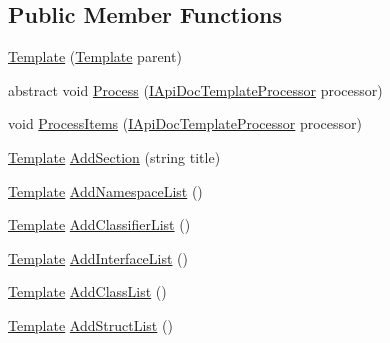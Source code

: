 \subsection*{Public Member Functions}
\begin{DoxyCompactItemize}
\item 
\hyperlink{class_software_engineering_tools_1_1_documentation_1_1_template_a584d4577dcd36a27254a3e340cfda808}{Template} (\hyperlink{class_software_engineering_tools_1_1_documentation_1_1_template}{Template} parent)
\item 
abstract void \hyperlink{class_software_engineering_tools_1_1_documentation_1_1_template_ab13b45a10b7eb65a0b6c15dbc1318664}{Process} (\hyperlink{interface_software_engineering_tools_1_1_documentation_1_1_i_api_doc_template_processor}{I\+Api\+Doc\+Template\+Processor} processor)
\item 
void \hyperlink{class_software_engineering_tools_1_1_documentation_1_1_template_a1af5e797aa609a3c851e01f020cb01e6}{Process\+Items} (\hyperlink{interface_software_engineering_tools_1_1_documentation_1_1_i_api_doc_template_processor}{I\+Api\+Doc\+Template\+Processor} processor)
\item 
\hyperlink{class_software_engineering_tools_1_1_documentation_1_1_template}{Template} \hyperlink{class_software_engineering_tools_1_1_documentation_1_1_template_a1811e36dbb694edb713597fb9b685698}{Add\+Section} (string title)
\item 
\hyperlink{class_software_engineering_tools_1_1_documentation_1_1_template}{Template} \hyperlink{class_software_engineering_tools_1_1_documentation_1_1_template_ad37173018ec87606db32b3fcf8a05e10}{Add\+Namespace\+List} ()
\item 
\hyperlink{class_software_engineering_tools_1_1_documentation_1_1_template}{Template} \hyperlink{class_software_engineering_tools_1_1_documentation_1_1_template_a03533df58d5fbb793ea79936d026d503}{Add\+Classifier\+List} ()
\item 
\hyperlink{class_software_engineering_tools_1_1_documentation_1_1_template}{Template} \hyperlink{class_software_engineering_tools_1_1_documentation_1_1_template_add1d1b4746d8424d5902edadcbfde0b1}{Add\+Interface\+List} ()
\item 
\hyperlink{class_software_engineering_tools_1_1_documentation_1_1_template}{Template} \hyperlink{class_software_engineering_tools_1_1_documentation_1_1_template_ae5451e4d1f252f72f870d5584b9a4a17}{Add\+Class\+List} ()
\item 
\hyperlink{class_software_engineering_tools_1_1_documentation_1_1_template}{Template} \hyperlink{class_software_engineering_tools_1_1_documentation_1_1_template_a06378a401cd0e89dfb9dde97330c236a}{Add\+Struct\+List} ()

\end{DoxyCompactItemize}
